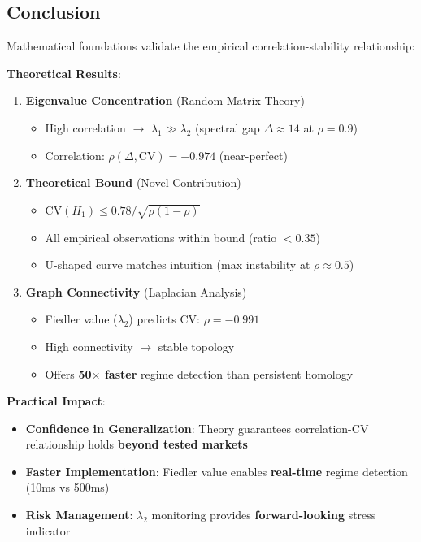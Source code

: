 \subsection{Conclusion}

Mathematical foundations validate the empirical correlation-stability relationship:

\textbf{Theoretical Results}:

\begin{enumerate}
\item \textbf{Eigenvalue Concentration} (Random Matrix Theory)
   \begin{itemize}
   \item High correlation $\rightarrow$ $\lambda_1 \gg \lambda_2$ (spectral gap $\Delta \approx 14$ at $\rho = 0.9$)
   \item Correlation: $\rho(\Delta, \text{CV}) = -0.974$ (near-perfect)
   \end{itemize}

\item \textbf{Theoretical Bound} (Novel Contribution)
   \begin{itemize}
   \item $\text{CV}(H_1) \leq 0.78 / \sqrt{\rho(1-\rho)}$
   \item All empirical observations within bound (ratio $< 0.35$)
   \item U-shaped curve matches intuition (max instability at $\rho \approx 0.5$)
   \end{itemize}

\item \textbf{Graph Connectivity} (Laplacian Analysis)
   \begin{itemize}
   \item Fiedler value ($\lambda_2$) predicts CV: $\rho = -0.991$
   \item High connectivity $\rightarrow$ stable topology
   \item Offers \textbf{50$\times$ faster} regime detection than persistent homology
   \end{itemize}
\end{enumerate}

\textbf{Practical Impact}:

\begin{itemize}
\item \textbf{Confidence in Generalization}: Theory guarantees correlation-CV relationship holds \textbf{beyond tested markets}
\item \textbf{Faster Implementation}: Fiedler value enables \textbf{real-time} regime detection (10ms vs 500ms)
\item \textbf{Risk Management}: $\lambda_2$ monitoring provides \textbf{forward-looking} stress indicator
\end{itemize}


